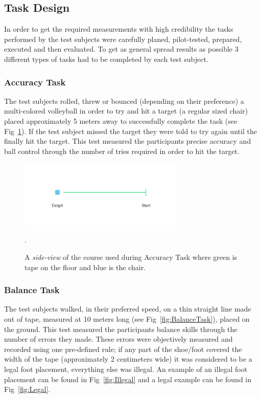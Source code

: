 \documentclass[runningheads,a4paper,oribibl]{llncs}
\begin{document}
\subsection{Task Design} \label{subsec:TaskDesign}

In order to get the required measurements with high credibility the tasks performed by the test subjects were carefully planed, pilot-tested, prepared, executed and then evaluated. To get as general spread results as possible 3 different types of tasks had to be completed by each test subject.

\subsubsection{Accuracy Task}

The test subjects rolled, threw or bounced (depending on their preference) a multi-colored volleyball in order to try and hit a target (a regular sized chair) placed approximately 5 meters away to successfully complete the task (see Fig~\ref{fig:AccuracyTask}). If the test subject missed the target they were told to try again until the finally hit the target. This test measured the participants precise accuracy and ball control through the number of tries required in order to hit the target.

\begin{figure}
   \centering
   \includegraphics[width=0.7\textwidth]{ExternalMaterial/AccuracyTask}
   \caption{A \emph{side-view} of the course used during Accuracy Task where green is tape on the floor and blue is the chair.}. \label{fig:AccuracyTask}
\end{figure}

\subsubsection{Balance Task}

The test subjects walked, in their preferred speed, on a thin straight line made out of tape, measured at 10 meters long (see Fig~\ref{fig:BalanceTask}), placed on the ground. This test measured the participants balance skills through the number of errors they made. These errors were objectively measured and recorded using one pre-defined rule; if any part of the shoe/foot covered the width of the tape (approximately 2 centimeters wide) it was considered to be a legal foot placement, everything else was illegal. An example of an illegal foot placement can be found in Fig~\ref{fig:Illegal} and a legal example can be found in Fig~\ref{fig:Legal}.
\end{document}
